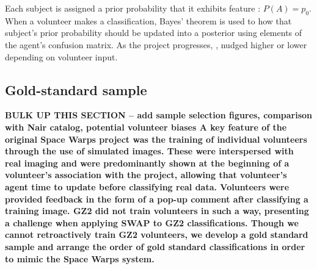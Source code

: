 Each subject is assigned a prior probability that it exhibits feature \A: $P(A) = p_0$. 
When a volunteer makes a classification, Bayes' theorem is used to  how 
that subject's prior probability should be updated into a posterior using elements
of the agent's confusion matrix. 
As the project progresses, ,
 nudged higher or lower depending on volunteer input. 


\subsection{Gold-standard sample}\label{sec: training sample}

\bf{BULK UP THIS SECTION -- add sample selection figures, comparison with Nair catalog, potential volunteer biases}
A key feature of the original Space Warps project was the training of 
individual volunteers through the use of simulated images.
These were interspersed with real imaging and were 
predominantly shown at the beginning of a volunteer's association with the project, 
allowing that volunteer's agent time to update before classifying real data. 
Volunteers were provided feedback in the form of a pop-up comment after
classifying a training image. GZ2 did not train volunteers in such a way, presenting
 a challenge when applying SWAP to GZ2 classifications. 
{Though we cannot retroactively train GZ2 volunteers, we develop a gold standard sample and arrange the order of gold standard classifications in order to mimic the Space Warps system.}


